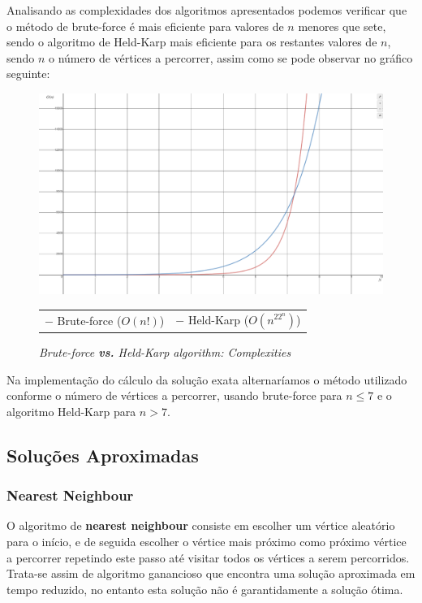 \documentclass[article, a4paper, 12pt, oneside]{memoir}
\begin{document}
\newpage
Analisando as complexidades dos algoritmos apresentados podemos verificar que o método de brute-force é mais eficiente para valores de $n$ menores que sete, sendo o algoritmo de Held-Karp mais eficiente para os restantes valores de $n$, sendo $n$ o número de vértices a percorrer, assim como se pode observar no gráfico seguinte:

\begin{figure}[h]
\centering
\includegraphics[scale=0.1]{tsp_exact_complexity}
\caption{\emph{Brute-force \textbf{vs.} Held-Karp algorithm: Complexities}}
\begin{tabular}{ l r }
\color{red} $-$ \color{black} Brute-force ($O(n!)$) & \color{blue} $-$ \color{black} Held-Karp ($O(n^22^n)$)
\end{tabular}
\end{figure}

Na implementação do cálculo da solução exata alternaríamos o método utilizado conforme o número de vértices a percorrer, usando brute-force para $n \leq 7$ e o algoritmo Held-Karp para $n > 7$.

\subsection{Soluções Aproximadas}
\subsubsection{Nearest Neighbour}
O algoritmo de \textbf{nearest neighbour} consiste em escolher um vértice aleatório para o início, e de seguida escolher o vértice mais próximo como próximo vértice a percorrer repetindo este passo até visitar todos os vértices a serem percorridos. Trata-se assim de algoritmo ganancioso que encontra uma solução aproximada em tempo reduzido, no entanto esta solução não é garantidamente a solução ótima.
\end{document}
